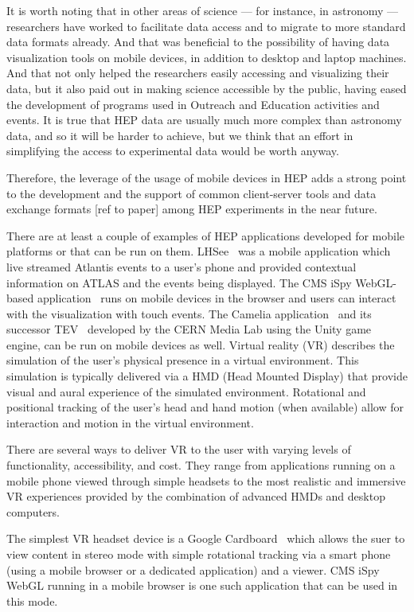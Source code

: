\documentclass[12pt,a4paper]{article}
\begin{document}
It is worth noting that in other areas of science --- for instance, in astronomy --- researchers have worked to facilitate data
access and to migrate to more standard data formats already. And that was beneficial to the possibility of having data visualization tools
on mobile devices, in addition to desktop and laptop machines. And that not only helped the researchers easily accessing and visualizing
their data, but it also paid out in making science accessible by the public, having eased the development of programs used in
Outreach and Education activities and events. It is true that HEP data are usually much more complex than astronomy data, and so it
will be harder to achieve, but we think that an effort in simplifying the access to experimental data would be worth anyway.

Therefore, the leverage of the usage of mobile devices in HEP adds a strong point to the development and the support of common
client-server tools and data exchange formats [ref to paper] among HEP experiments in the near future.

There are at least a couple of examples of HEP applications developed for mobile platforms or that can be run on them. LHSee~\cite{LHSee}
was a mobile application which live streamed Atlantis events to a user’s phone and provided contextual information on ATLAS and the
events being displayed. The CMS iSpy WebGL-based application~\cite{CMSISpyWebGL} runs on mobile devices in the browser and users can interact
with the visualization with touch events. The Camelia application~\cite{CERNCamelia} and its successor TEV~\cite{CERNTEV} developed by the
CERN Media Lab using the Unity game engine, can be run on mobile devices as well.
Virtual reality (VR) describes the simulation of the user’s physical presence in a virtual environment. This simulation is typically
delivered via a HMD (Head Mounted Display) that provide visual and aural experience of the simulated environment. Rotational and
positional tracking of the user’s head and hand motion (when available) allow for interaction and motion in the virtual environment.

There are several ways to deliver VR to the user with varying levels of functionality, accessibility, and cost. They range from
applications running on a mobile phone viewed through simple headsets to the most realistic and immersive VR experiences provided
by the combination of advanced HMDs and desktop computers.

The simplest VR headset device is a Google Cardboard~\cite{GoogleCardboard} which allows the suer to view content in stereo mode with
simple rotational tracking via a smart phone (using a mobile browser or a dedicated application) and a viewer. CMS iSpy WebGL running
in a mobile browser is one such application that can be used in this mode.
\end{document}

